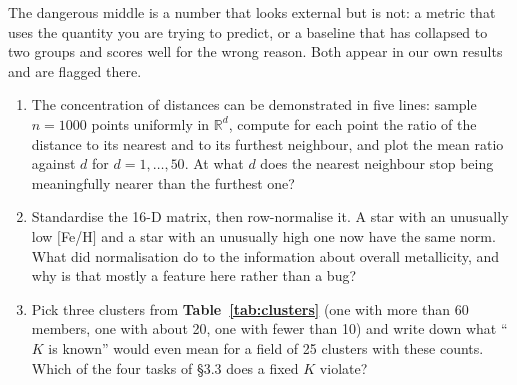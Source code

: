 The dangerous middle is a number that looks external but is not: a metric that
uses the quantity you are trying to predict, or a baseline that has collapsed
to two groups and scores well for the wrong reason. Both appear in our own
results and are flagged there.

\begin{issues}[EXERCISES]
\begin{enumerate}
\item The concentration of distances can be demonstrated in five lines:
  sample $n=1000$ points uniformly in $\mathbb{R}^d$, compute for each point
  the ratio of the distance to its nearest and to its furthest neighbour, and
  plot the mean ratio against $d$ for $d = 1,\dots,50$. At what $d$ does the
  nearest neighbour stop being meaningfully nearer than the furthest one?
\item Standardise the 16-D matrix, then row-normalise it. A star with an
  unusually low $[$Fe/H$]$ and a star with an unusually high one now have the
  same norm. What did normalisation do to the information about overall
  metallicity, and why is that mostly a feature here rather than a bug?
\item Pick three clusters from \textbf{Table~\ref{tab:clusters}} (one with more
than 60 members, one with about 20, one with fewer than 10) and write down what
``$K$ is known'' would even mean for a field of 25 clusters with these counts.
Which of the four tasks of \S 3.3 does a fixed $K$ violate?
\end{enumerate}
\end{issues}
